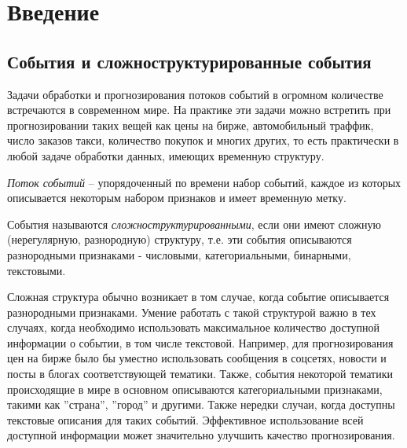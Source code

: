 \section{Введение}
\label{sec:intro} 

\subsection{События и сложноструктурированные события} \label{sect:complex_struct_event}
Задачи обработки и прогнозирования потоков событий в огромном количестве встречаются в современном мире. На практике эти задачи можно встретить при прогнозировании таких вещей как цены на бирже, автомобильный траффик, число заказов такси, количество покупок и многих других, то есть практически в любой задаче обработки данных, имеющих временн\textit{у}ю структуру. 

\textit{Поток событий} -- упорядоченный по времени набор событий, каждое из которых описывается некоторым набором признаков и имеет временн\textit{у}ю метку. 

События называются \textit{сложноструктурированными}, если они имеют сложную (нерегулярную, разнородную) структуру, т.е. эти события описываются  разнородными признаками - числовыми, категориальными, бинарными,  текстовыми. 

Сложная структура обычно возникает в том случае, когда событие описывается разнородными признаками. Умение работать с такой структурой важно в тех случаях, когда необходимо использовать максимальное количество доступной информации о событии, в том числе текстовой. Например, для прогнозирования цен на бирже было бы уместно использовать сообщения в соцсетях, новости и посты в блогах соответствующей тематики. Также, события некоторой тематики происходящие в мире в основном описываются категориальными признаками, такими как ''страна'', ''город'' и другими. Также нередки случаи, когда доступны текстовые описания для таких событий. Эффективное использование всей доступной информации может значительно улучшить качество прогнозирования.

